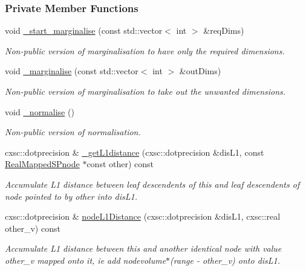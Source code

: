 \subsubsection*{\-Private \-Member \-Functions}
\begin{DoxyCompactItemize}
\item 
void \hyperlink{classsubpavings_1_1RealMappedSPnode_a4f2a09e57bff1fd459e8bf631019b07f}{\-\_\-start\-\_\-marginalise} (const std\-::vector$<$ int $>$ \&req\-Dims)
\begin{DoxyCompactList}\small\item\em \-Non-\/public version of marginalisation to have only the required dimensions. \end{DoxyCompactList}\item 
void \hyperlink{classsubpavings_1_1RealMappedSPnode_a14871e233412eac80e1b742967d7ab2b}{\-\_\-marginalise} (const std\-::vector$<$ int $>$ \&out\-Dims)
\begin{DoxyCompactList}\small\item\em \-Non-\/public version of marginalisation to take out the unwanted dimensions. \end{DoxyCompactList}\item 
void \hyperlink{classsubpavings_1_1RealMappedSPnode_a185405d2c7b3231a75b33ec249292e2d}{\-\_\-normalise} ()
\begin{DoxyCompactList}\small\item\em \-Non-\/public version of normalisation. \end{DoxyCompactList}\item 
cxsc\-::dotprecision \& \hyperlink{classsubpavings_1_1RealMappedSPnode_a769c7c79a6ce88db0854b2cbffb97747}{\-\_\-get\-L1distance} (cxsc\-::dotprecision \&dis\-L1, const \hyperlink{classsubpavings_1_1RealMappedSPnode}{\-Real\-Mapped\-S\-Pnode} $\ast$const other) const 
\begin{DoxyCompactList}\small\item\em \-Accumulate \-L1 distance between leaf descendents of this and leaf descendents of node pointed to by {\itshape other\/} into {\itshape dis\-L1\/}. \end{DoxyCompactList}\item 
cxsc\-::dotprecision \& \hyperlink{classsubpavings_1_1RealMappedSPnode_a3171d7822ccbcb05ed2b997c678b325a}{node\-L1\-Distance} (cxsc\-::dotprecision \&dis\-L1, cxsc\-::real other\-\_\-v) const 
\begin{DoxyCompactList}\small\item\em \-Accumulate \-L1 distance between this and another identical node with value {\itshape other\-\_\-v\/} mapped onto it, ie add nodevolume$\ast$(range -\/ other\-\_\-v) onto {\itshape dis\-L1\/}. \end{DoxyCompactList}\item 

\end{DoxyCompactItemize}
